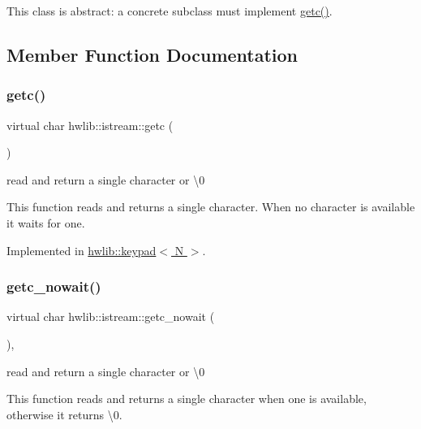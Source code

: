 This class is abstract\+: a concrete subclass must implement \hyperlink{classhwlib_1_1istream_a9a260f800b08d4788b9e399f65d1c728}{getc()}. 

\subsection{Member Function Documentation}
\mbox{\label{classhwlib_1_1istream_a9a260f800b08d4788b9e399f65d1c728}} 
\subsubsection{\texorpdfstring{getc()}{getc()}}
{\footnotesize\ttfamily virtual char hwlib\+::istream\+::getc (\begin{DoxyParamCaption}{ }\end{DoxyParamCaption})\hspace{0.3cm}{\ttfamily [pure virtual]}}

read and return a single character or \textquotesingle{}\textbackslash{}0\textquotesingle{}

This function reads and returns a single character. When no character is available it waits for one. 

Implemented in \hyperlink{classhwlib_1_1keypad_aa2a2ab2fca1de5daa5587b3433c8e74a}{hwlib\+::keypad$<$ N $>$}.

\mbox{\label{classhwlib_1_1istream_aa4ff0ebb0bd23b9fb765520aa49416f4}} 
\subsubsection{\texorpdfstring{getc\+\_\+nowait()}{getc\_nowait()}}
{\footnotesize\ttfamily virtual char hwlib\+::istream\+::getc\+\_\+nowait (\begin{DoxyParamCaption}{ }\end{DoxyParamCaption})\hspace{0.3cm}{\ttfamily [inline]}, {\ttfamily [virtual]}}

read and return a single character or \textquotesingle{}\textbackslash{}0\textquotesingle{}

This function reads and returns a single character when one is available, otherwise it returns \textquotesingle{}\textbackslash{}0\textquotesingle{}. 

